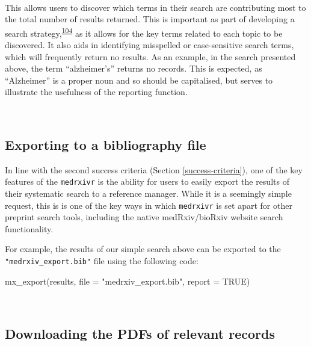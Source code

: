 \documentclass[a4paper, twoside]{templates/ociamthesis}
\newenvironment{Shaded}{\begin{snugshade}}{\end{snugshade}}
\newcommand{\AttributeTok}[1]{\textcolor[rgb]{0.77,0.63,0.00}{#1}}
\newcommand{\ConstantTok}[1]{\textcolor[rgb]{0.00,0.00,0.00}{#1}}
\newcommand{\FunctionTok}[1]{\textcolor[rgb]{0.00,0.00,0.00}{#1}}
\newcommand{\NormalTok}[1]{#1}
\newcommand{\StringTok}[1]{\textcolor[rgb]{0.31,0.60,0.02}{#1}}
\renewenvironment{Shaded}
{
  \vspace{4pt}%
  \begin{snugshade}%
}{%
  \end{snugshade}%
  \vspace{4pt}%
}
\begin{document}
~

This allows users to discover which terms in their search are contributing most to the total number of results returned. This is important as part of developing a search strategy,\textsuperscript{\protect\hyperlink{ref-bramer2018}{104}} as it allows for the key terms related to each topic to be discovered. It also aids in identifying misspelled or case-sensitive search terms, which will frequently return no results. As an example, in the search presented above, the term ``alzheimer's'' returns no records. This is expected, as ``Alzheimer'' is a proper noun and so should be capitalised, but serves to illustrate the usefulness of the reporting function.

~

\hypertarget{exporting-to-a-bibliography-file}{%
\subsection{Exporting to a bibliography file}\label{exporting-to-a-bibliography-file}}

In line with the second success criteria (Section \ref{success-criteria}), one of the key features of the \texttt{medrxivr} is the ability for users to easily export the results of their systematic search to a reference manager. While it is a seemingly simple request, this is is one of the key ways in which \texttt{medrxivr} is set apart for other preprint search tools, including the native medRxiv/bioRxiv website search functionality.

For example, the results of our simple search above can be exported to the \texttt{"medrxiv\_export.bib"} file using the following code:

\begin{Shaded}
\begin{Highlighting}[]
\FunctionTok{mx\_export}\NormalTok{(results, }
          \AttributeTok{file =} \StringTok{"medrxiv\_export.bib"}\NormalTok{,}
          \AttributeTok{report =} \ConstantTok{TRUE}\NormalTok{)}
\end{Highlighting}
\end{Shaded}

~

\hypertarget{downloading-the-pdfs-of-relevant-records}{%
\subsection{Downloading the PDFs of relevant records}\label{downloading-the-pdfs-of-relevant-records}}
\end{document}
